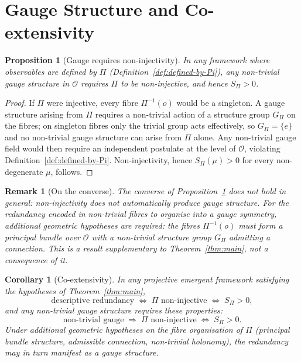 \documentclass[12pt,a4paper]{article}
\newtheorem{proposition}[theorem]{Proposition}
\newtheorem{corollary}[theorem]{Corollary}
\newtheorem{remark}{Remark}
\begin{document}
  \section{Gauge Structure and Co-extensivity}
  \label{sec:gauge}

  \begin{proposition}[Gauge requires non-injectivity]
    \label{prop:gauge}
    In any framework where observables are defined by $\Pi$
    (Definition~\ref{def:defined-by-Pi}), any non-trivial gauge structure
    in $\mathcal{O}$ requires $\Pi$ to be non-injective, and hence $S_\Pi > 0$.
  \end{proposition}

  \begin{proof}
    If $\Pi$ were injective, every fibre $\Pi^{-1}(o)$ would be a singleton.
    A gauge structure arising from $\Pi$ requires a non-trivial action of a structure group $G_\Pi$ on the
    fibres; on singleton fibres only the trivial group acts effectively, so $G_\Pi = \{e\}$ and no non-trivial
    gauge structure can arise from $\Pi$ alone.
    Any non-trivial gauge field would then require an independent postulate at
    the level of $\mathcal{O}$, violating Definition~\ref{def:defined-by-Pi}.
    Non-injectivity, hence $S_\Pi(\mu) > 0$ for every non-degenerate $\mu$, follows.
  \end{proof}

  \begin{remark}[On the converse]
    \label{rem:converse}
    The converse of Proposition~\ref{prop:gauge} does not hold in general:
    non-injectivity does not automatically produce gauge structure.
    For the redundancy encoded in non-trivial fibres to organise into a gauge
    symmetry, additional geometric hypotheses are required: the fibres
    $\Pi^{-1}(o)$ must form a principal bundle over $\mathcal{O}$ with a
    non-trivial structure group $G_\Pi$ admitting a connection.
    This is a result supplementary to Theorem~\ref{thm:main}, not a consequence
    of it.
  \end{remark}

  \begin{corollary}[Co-extensivity]
    \label{cor:co-ext}
    In any projective emergent framework satisfying the hypotheses of
    Theorem~\ref{thm:main},
    \[
      \text{descriptive redundancy}
      \;\Longleftrightarrow\;
      \Pi \text{ non-injective}
      \;\Longleftrightarrow\;
      S_\Pi > 0,
    \]
    and any non-trivial gauge structure requires these properties:
    \[
      \text{non-trivial gauge}
      \;\Longrightarrow\;
      \Pi \text{ non-injective}
      \;\Longleftrightarrow\;
      S_\Pi > 0.
    \]
    Under additional geometric hypotheses on the fibre organisation of $\Pi$
    (principal bundle structure, admissible connection, non-trivial holonomy),
    the redundancy may in turn manifest as a gauge structure.
  \end{corollary}
\end{document}
